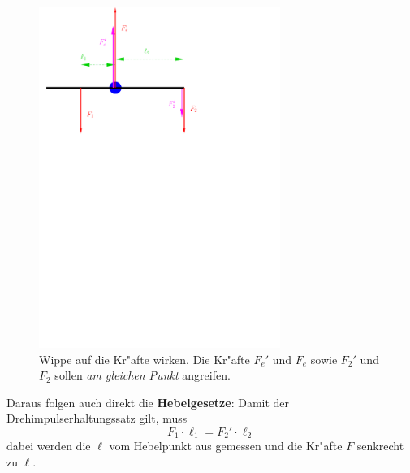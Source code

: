 \begin{figure}
   \centering
   \includegraphics[width=0.7\textwidth]{bilder/wippe}
   \caption[Wippe im Gleichgewicht]{Wippe auf die Kr"afte wirken. Die
     Kr"afte $F_e'$ und $F_e$ sowie $F_2'$ und $F_2$ sollen \emph{am
       gleichen Punkt} angreifen.}
   \label{abb_wippe}
\end{figure}

\bigskip

Daraus folgen auch direkt die
\textbf{Hebelgesetze}: Damit der
Drehimpulserhaltungssatz gilt, muss
\begin{equation}
   \label{eqn_def_hebelgesetz}
   \boxed{
F_1 \cdot \ell_1 = F_2' \cdot \ell_2
}
\end{equation}
dabei werden die $\ell$ vom Hebelpunkt aus gemessen und die Kr"afte $F$
senkrecht zu $\ell$.

\bigskip

